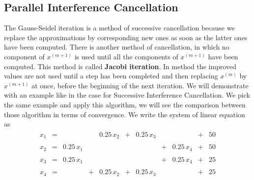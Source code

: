 \subsection{Parallel Interference Cancellation}
The Gauss-Seidel iteration is a method of successive cancellation because we replace the approximations by corresponding new ones as soon as the latter ones have been computed. There is another method of cancellation, in which no component of $x^{(m+1)}$ is used until all the components of $x^{(m+1)}$ have been computed. This method is called \textbf{Jacobi iteration}. In method the improved values are not used until a step has been completed and then replacing $x^{(m)}$ by $x^{(m+1)}$ at once, before the beginning of the next iteration. We will demonstrate with an example like in the case for Successive Interference Cancellation. We pick the same example and apply this algorithm, we will see the comparison between those algorithm in terms of convergence. We write the system of linear equation as
\begin{eqnarray}
\begin{array}{rrrrrrrrrrr}
x_1          &=&             & & 0.25\,x_2   &+& 0.25\,x_3   &&              &+& 50 \\ \\

x_2          &=& 0.25\,x_1   & &             & &             &+& 0.25\,x_4   &+& 50 \\ \\

x_3          &=& 0.25\,x_1   & &             & &             &+& 0.25\,x_4   &+& 25 \\ \\             
	     
x_4          &=& 	     &+& 0.25\,x_2   &+& 0.25\,x_3   & &             &+& 25 \\ \\ 
\end{array}
\end{eqnarray}

